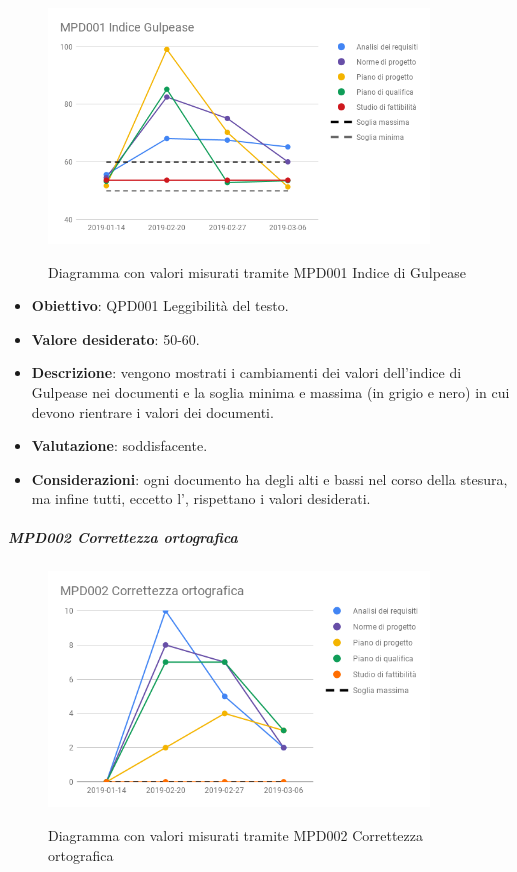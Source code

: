 	\begin{figure}[H]
		\centering
		\includegraphics[width=0.9\textwidth]{img/cruscotti/MPD001.png}
		\label{immaginegulpease}
		\caption{Diagramma con valori misurati tramite MPD001 Indice di Gulpease}
	\end{figure}

	\begin{itemize}
		\item \textbf{Obiettivo}: QPD001 Leggibilità del testo.
		\item \textbf{Valore desiderato}: 50-60.
		\item \textbf{Descrizione}: vengono mostrati i cambiamenti dei valori dell'indice di Gulpease nei documenti e la soglia minima e massima (in grigio e nero) in cui devono rientrare i valori dei documenti. 
		\item \textbf{Valutazione}: soddisfacente.
		\item \textbf{Considerazioni}: ogni documento ha degli alti e bassi nel corso della stesura, ma infine tutti, eccetto l'\AdR, rispettano i valori desiderati.
	\end{itemize}


	\subparagraph{MPD002 Correttezza ortografica}

	\begin{figure}[H]
		\centering
		\includegraphics[width=0.9\textwidth]{img/cruscotti/MPD002.png}
		\label{immagineCorrettezzaOrtografica}
		\caption{Diagramma con valori misurati tramite MPD002 Correttezza ortografica}
	\end{figure}

